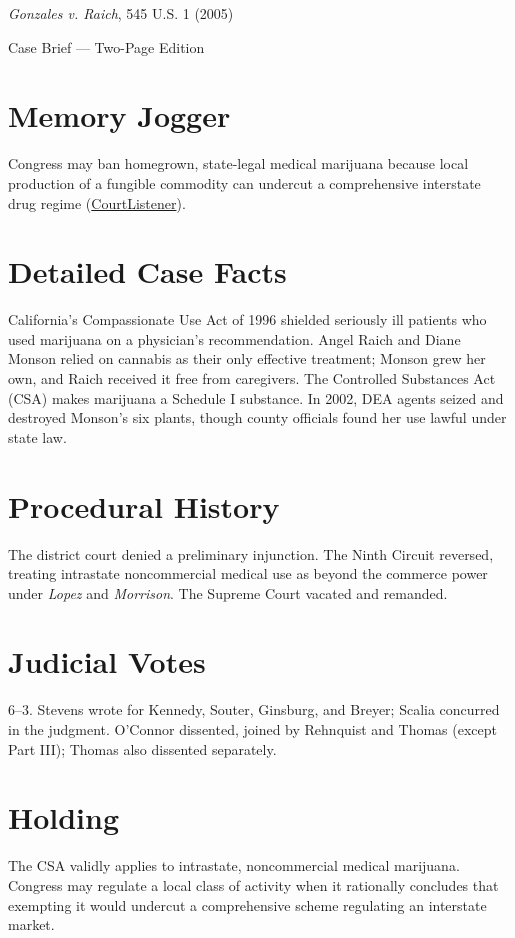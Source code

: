 \documentclass[12pt]{article}
\begin{document}
\begin{center}
{\LARGE \textit{Gonzales v. Raich}, 545 U.S. 1 (2005)\par}
\vspace{0.5em}
{\large Case Brief --- Two-Page Edition\par}
\end{center}

\section{Memory Jogger}
Congress may ban homegrown, state-legal medical marijuana because local production of a fungible commodity can undercut a comprehensive interstate drug regime (\href{https://www.courtlistener.com/opinion/799995/gonzales-v-raich/}{CourtListener}).

\section{Detailed Case Facts}
California's Compassionate Use Act of 1996 shielded seriously ill patients who used marijuana on a physician's recommendation. Angel Raich and Diane Monson relied on cannabis as their only effective treatment; Monson grew her own, and Raich received it free from caregivers. The Controlled Substances Act (CSA) makes marijuana a Schedule I substance. In 2002, DEA agents seized and destroyed Monson's six plants, though county officials found her use lawful under state law.

\section{Procedural History}
The district court denied a preliminary injunction. The Ninth Circuit reversed, treating intrastate noncommercial medical use as beyond the commerce power under \textit{Lopez} and \textit{Morrison}. The Supreme Court vacated and remanded.

\section{Judicial Votes}
6--3. Stevens wrote for Kennedy, Souter, Ginsburg, and Breyer; Scalia concurred in the judgment. O'Connor dissented, joined by Rehnquist and Thomas (except Part III); Thomas also dissented separately.

\section{Holding}
The CSA validly applies to intrastate, noncommercial medical marijuana. Congress may regulate a local class of activity when it rationally concludes that exempting it would undercut a comprehensive scheme regulating an interstate market.
\end{document}
